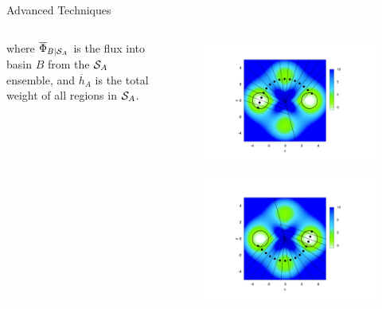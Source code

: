 \documentclass[final]{beamer}
\begin{document}
\begin{columns}[t]
\begin{column}{.33\linewidth}
\begin{block}{Advanced Techniques}
\begin{columns}[t]
\begin{column}{.65\linewidth}
	  where $\overline{\Phi}_{B \mid {\cal S}_A}$ is the flux into basin $B$ from the ${\cal S}_A$ ensemble, and $\overline{h}_A$ is the total weight of all regions in ${\cal S}_A$.
	    \end{column}
	    \begin{column}{.25\linewidth}
	      \begin{figure}
 		\includegraphics[width=3 in]{images/contvorf.pdf}
	      \end{figure}
	      \begin{figure}
 		\includegraphics[width=3 in]{images/contvorr.pdf}
	      \end{figure}
	    \end{column}
	  \end{columns}
	  

\end{block}
\end{column}
\end{columns}
\end{document}
